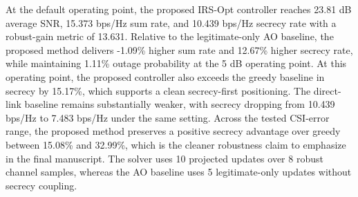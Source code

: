 At the default operating point, the proposed IRS-Opt controller reaches 23.81 dB average SNR, 15.373 bps/Hz sum rate, and 10.439 bps/Hz secrecy rate with a robust-gain metric of 13.631. Relative to the legitimate-only AO baseline, the proposed method delivers -1.09\% higher sum rate and 12.67\% higher secrecy rate, while maintaining 1.11\% outage probability at the 5 dB operating point. At this operating point, the proposed controller also exceeds the greedy baseline in secrecy by 15.17\%, which supports a clean secrecy-first positioning. The direct-link baseline remains substantially weaker, with secrecy dropping from 10.439 bps/Hz to 7.483 bps/Hz under the same setting. Across the tested CSI-error range, the proposed method preserves a positive secrecy advantage over greedy between 15.08\% and 32.99\%, which is the cleaner robustness claim to emphasize in the final manuscript. The solver uses 10 projected updates over 8 robust channel samples, whereas the AO baseline uses 5 legitimate-only updates without secrecy coupling.
